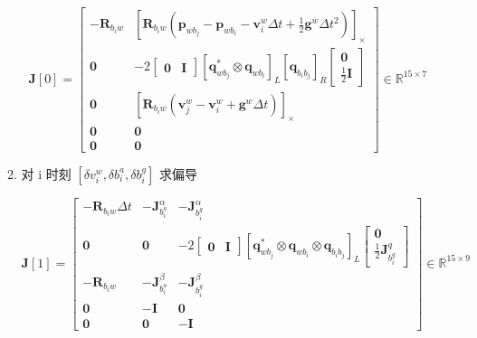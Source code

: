 \documentclass[12pt,a4paper]{article}
\begin{document}
\begin{enumerate}
\begin{enumerate}
\begin{equation}
\mathbf{J}[0]=
\begin{bmatrix}
-\mathbf{R}_{b_{i} w} & \left[\mathbf{R}_{b_{i} w}\left(\mathbf{p}_{w b_{j}}-\mathbf{p}_{w b_{i}}-\mathbf{v}_{i}^{w} \Delta t+\frac{1}{2} \mathbf{g}^{w} \Delta t^{2}\right)\right]_{\times} \\
\mathbf{0} & -2\left[\begin{array}{ll}{\mathbf{0}} & {\mathbf{I}}\end{array}\right]\left[\mathbf{q}_{w b_{j}}^{*} \otimes \mathbf{q}_{w b_{i}}\right]_{L}\left[\mathbf{q}_{b_{i} b_{j}}\right]_{R}\left[\begin{array}{c}{\mathbf{0}} \\ {\frac{1}{2} \mathbf{I}}\end{array}\right] \\
\mathbf{0} & \left[\mathbf{R}_{b_{i} w}\left(\mathbf{v}_{j}^{w}-\mathbf{v}_{i}^{w}+\mathbf{g}^{w} \Delta t\right)\right]_{\times} \\
\mathbf{0} & \mathbf{0}  \\
\mathbf{0} & \mathbf{0} 
\end{bmatrix}
\in \mathbb{R}^{15 \times 7}
\end{equation}

\item 对 {\color{blue}i 时刻 $[\delta v^{w}_{i},\delta b^a_{i},\delta b^g_{i}]$} 求偏导

\begin{equation}
\mathbf{J}[1]=
\begin{bmatrix}
-\mathbf{R}_{b_{i} w} \Delta t & -\mathbf{J}_{b_{i}^{a}}^{\alpha} & -\mathbf{J}_{b_{i}^{g}}^{\alpha} \\
\mathbf{0} & \mathbf{0} & -2\left[\begin{array}{ll}{\mathbf{0}} & {\mathbf{I}}\end{array}\right]\left[\mathbf{q}_{w b_{j}}^{*} \otimes \mathbf{q}_{w b_{i}} \otimes \mathbf{q}_{b_{i} b_{j}}\right]_{L}\left[\begin{array}{c}{\mathbf{0}} \\ {\frac{1}{2} \mathbf{J}_{b_{i}^{g}}^{q}}\end{array}\right] \\
-\mathbf{R}_{b_{i} w} & -\mathbf{J}_{b_{i}^{a}}^{\beta} & -\mathbf{J}_{b_{i}^{g}}^{\beta} \\
\mathbf{0} & -\mathbf{I}  &  \mathbf{0} \\
\mathbf{0} &  \mathbf{0}  & -\mathbf{I}
\end{bmatrix}
\in \mathbb{R}^{15 \times 9}
\end{equation}


\end{enumerate}
\end{enumerate}
\end{document}
